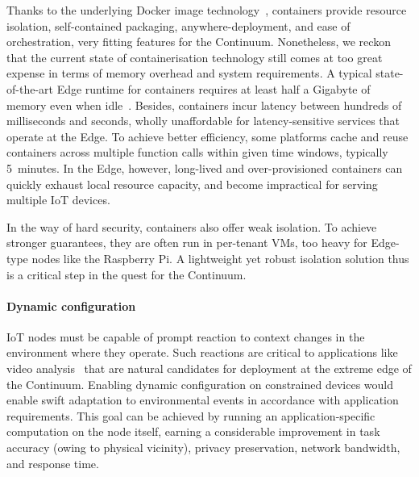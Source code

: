 Thanks to the underlying Docker image technology~\cite{docker-image}, containers provide resource isolation, self-contained packaging, anywhere-deployment, and ease of orchestration, very fitting features for the Continuum.
Nonetheless, we reckon that the current state of containerisation technology still comes at too great expense in terms of memory overhead and system requirements. A typical state-of-the-art Edge runtime for containers requires at least half a Gigabyte of memory even when idle~\cite{bohm2021profiling}. Besides, containers incur latency between hundreds of milliseconds and seconds, wholly unaffordable for latency-sensitive services that operate at the Edge. 
To achieve better efficiency, some platforms cache and reuse containers across multiple function calls within given time windows, typically 5~minutes. 
In the Edge, however, long-lived and over-provisioned containers can quickly exhaust local resource capacity, and become impractical for serving multiple IoT devices. 

In the way of hard security, containers also offer weak isolation. To achieve stronger guarantees, they are often run in per-tenant VMs, too heavy for Edge-type nodes like the Raspberry Pi. 
A light\-weight yet robust isolation solution thus is a critical step in the quest for the Continuum.

\paragraph{Dynamic configuration}\label{p:dynamic-configuration}

IoT nodes must be capable of prompt reaction to context changes in the environment where they operate. Such reactions are critical to applications like video analysis~\cite{jang2018application} that are natural candidates for deployment at the extreme edge of the Continuum. 
Enabling dynamic configuration on constrained devices would enable swift adaptation to environmental events in accordance with application requirements. 
This goal can be achieved by running an application-specific computation on the node itself, earning a considerable improvement in task accuracy (owing to physical vicinity), privacy preservation, network bandwidth, and response time.

